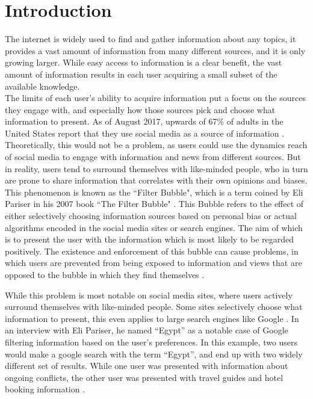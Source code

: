\chapter{Introduction}
The internet is widely used to find and gather information about any topics, it
provides a vast amount of information from many different sources, and it is
only growing larger.
While easy access to information is a clear benefit, the vast amount of
information results in each user acquiring a small subset of the available
knowledge.\\
The limits of each user's ability to acquire information put a focus on the
sources they engage with, and especially how those sources pick and choose what
information to present.
As of August 2017, upwards of 67\% of adults in the United States report that
they use social media as a source of information \citep{journalism2017}.
Theoretically, this would not be a problem, as users could use the dynamics
reach of social media to engage with information and news from different sources.
But in reality, users tend to surround themselves with like-minded people, who
in turn are prone to share information that correlates with their own opinions
and biases.\\

This phenomenon is known as the ``Filter Bubble", which is a term coined by Eli
Pariser in his 2007 book ``The Filter Bubble" \citep{pariser2011filter}.
This Bubble refers to the effect of either selectively choosing information
sources based on personal bias or actual algorithms encoded in the social media
sites or search engines.
The aim of which is to present the user with the information which is most
likely to be regarded positively.
The existence and enforcement of this bubble can cause problems, in which users
are prevented from being exposed to information and views that are opposed to
the bubble in which they find themselves \citep[p.59-73]{pariser2011filter}.\nl

While this problem is most notable on social media sites, where users actively
surround themselves with like-minded people. Some sites
selectively choose what information to present, this even applies to large
search engines like Google \citep{filterBubbleDef}.
In an interview with Eli Pariser, he named ``Egypt'' as a notable case of Google
filtering information based on the user's preferences.
In this example, two users would make a google search with the term ``Egypt'',
and end up with two widely different set of results.
While one user was presented with information about ongoing conflicts, the other
user was presented with travel guides and hotel booking information
\citep{nusSduSearch}.